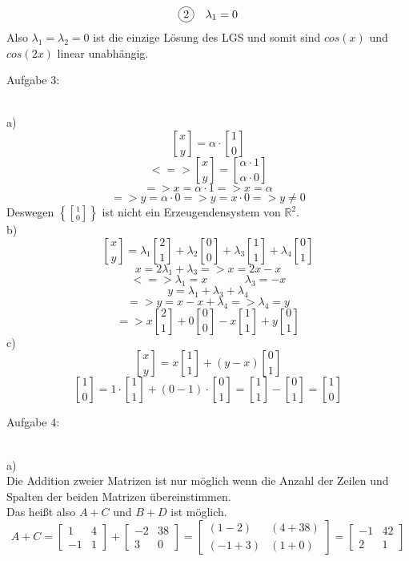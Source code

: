 \documentclass[11pt]{article}
\newcommand*\circled[1]{\tikz[baseline=(char.base)]{
            \node[shape=circle,draw,inner sep=2pt] (char) {#1};}}
\DeclareRobustCommand{\brkbinom}{\genfrac[]{0pt}{}}
\begin{document}
					$$\circled{2} \hspace{10pt} \lambda_1=0$$
					Also $\lambda_1=\lambda_2=0$ ist die einzige Lösung des LGS und somit sind $cos(x)$ und $cos(2x)$ linear unabhängig.\\
			\noindent \begin{Large}Aufgabe 3:\end{Large}\\[2pt]
				\indent a)\\
					$$\brkbinom{x}{y}=\alpha \cdot \brkbinom{1}{0}$$
					$$<=>\brkbinom{x}{y}=\brkbinom{\alpha \cdot 1}{\alpha \cdot 0}$$
					$$=>x=\alpha \cdot 1 => x=\alpha$$
					$$=>y=\alpha \cdot 0 => y= x \cdot 0 => y \neq 0$$
					Deswegen $\left\{ \brkbinom{1}{0} \right\}$ ist nicht ein Erzeugendensystem von $\mathbb{R}^2$.\\
				\indent b)\\
					$$\brkbinom{x}{y}=\lambda_1 \brkbinom{2}{1}+\lambda_2 \brkbinom{0}{0}+\lambda_3 \brkbinom{1}{1}+\lambda_4 \brkbinom{0}{1}$$
					$$x=2\lambda_1+\lambda_3 => x=2x-x$$
					$$<=>\lambda_1=x \hspace{40pt} \lambda_3=-x$$
					$$y=\lambda_1+\lambda_3+\lambda_4$$
					$$=>y=x-x+\lambda_4 => \lambda_4=y$$
					$$=>x \brkbinom{2}{1}+0 \brkbinom{0}{0}-x \brkbinom{1}{1}+y \brkbinom{0}{1}$$
				\indent c)\\
					$$\brkbinom{x}{y}=x\brkbinom{1}{1}+(y-x)\brkbinom{0}{1}$$
					$$\brkbinom{1}{0}=1 \cdot \brkbinom{1}{1}+(0-1) \cdot \brkbinom{0}{1}=\brkbinom{1}{1}-\brkbinom{0}{1}=\brkbinom{1}{0}$$
			\noindent \begin{Large}Aufgabe 4:\end{Large}\\[2pt]
				\indent a)\\
					Die Addition zweier Matrizen ist nur möglich wenn die Anzahl der Zeilen und Spalten der beiden Matrizen übereinstimmen.\\
					Das heißt also $A+C$ und $B+D$ ist möglich.\\
					$$A+C=\begin{bmatrix}1&4\\-1&1\end{bmatrix}+\begin{bmatrix}-2&38\\3&0\end{bmatrix}=\begin{bmatrix}(1-2)&(4+38)\\(-1+3)&(1+0)\end{bmatrix}=\begin{bmatrix}-1&42\\2&1\end{bmatrix}$$
\end{document}
